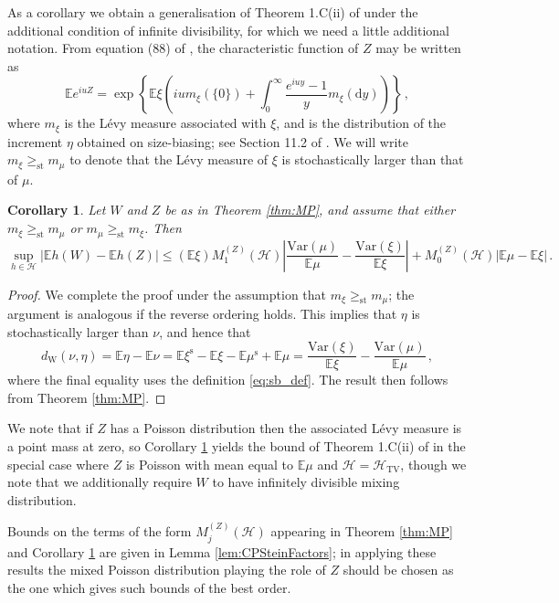 \documentclass[12pt]{article}
\newtheorem{corollary}[theorem]{Corollary}
\begin{document}
As a corollary we obtain a generalisation of Theorem 1.C(ii) of \cite{barbour92_book} under the additional condition of infinite divisibility, for which we need a little additional notation. From equation (88) of \cite{arratia19}, the characteristic function of $Z$ may be written as
\[
\mathbb{E}e^{iuZ}=\exp\left\{\mathbb{E}\xi\left(ium_\xi(\{0\})+\int_0^\infty\frac{e^{iuy}-1}{y}m_\xi(\text{d}y)\right)\right\}\,,
\]
where $m_\xi$ is the L\'evy measure associated with $\xi$, and is the distribution of the increment $\eta$ obtained on size-biasing; see Section 11.2 of \cite{arratia19}. We will write $m_\xi\geq_\text{st}m_\mu$ to denote that the L\'evy measure of $\xi$ is stochastically larger than that of $\mu$.
\begin{corollary}\label{cor:MP_ordering}
Let $W$ and $Z$ be as in Theorem \ref{thm:MP}, and assume that either $m_\xi\geq_\text{st}m_\mu$ or $m_\mu\geq_\text{st}m_\xi$. Then
\[
\sup_{h\in\mathcal{H}}|\mathbb{E}h(W)-\mathbb{E}h(Z)|\leq(\mathbb{E}\xi)M_1^{(Z)}(\mathcal{H})
\left|\frac{\text{Var}(\mu)}{\mathbb{E}\mu}-\frac{\text{Var}(\xi)}{\mathbb{E}\xi}\right|+M_0^{(Z)}(\mathcal{H})|\mathbb{E}\mu-\mathbb{E}\xi|\,.
\]
\end{corollary}
\begin{proof}
We complete the proof under the assumption that $m_\xi\geq_\text{st}m_\mu$; the argument is analogous if the reverse ordering holds. This implies that $\eta$ is stochastically larger than $\nu$, and hence that
\[
d_\text{W}(\nu,\eta)=\mathbb{E}\eta-\mathbb{E}\nu=\mathbb{E}\xi^\text{s}-\mathbb{E}\xi-\mathbb{E}\mu^\text{s}+\mathbb{E}\mu=\frac{\text{Var}(\xi)}{\mathbb{E}\xi}-\frac{\text{Var}(\mu)}{\mathbb{E}\mu}\,,
\]
where the final equality uses the definition \eqref{eq:sb_def}. The result then follows from Theorem \ref{thm:MP}.
\end{proof}
We note that if $Z$ has a Poisson distribution then the associated L\'evy measure is a point mass at zero, so Corollary \ref{cor:MP_ordering} yields the bound of Theorem 1.C(ii) of \cite{barbour92_book} in the special case where $Z$ is Poisson with mean equal to $\mathbb{E}\mu$ and $\mathcal{H}=\mathcal{H}_\text{TV}$, though we note that we additionally require $W$ to have infinitely divisible mixing distribution. 

Bounds on the terms of the form $M_j^{(Z)}(\mathcal{H})$ appearing in Theorem \ref{thm:MP} and Corollary \ref{cor:MP_ordering} are given in Lemma \ref{lem:CPSteinFactors}; in applying these results the mixed Poisson distribution playing the role of $Z$ should be chosen as the one which gives such bounds of the best order. 
\end{document}
